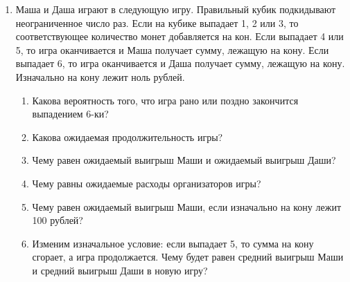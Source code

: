 \documentclass[12pt]{article}
\newcommand{\addtag}[1]{}
\begin{document}
\begin{enumerate}[resume]
   \item  Маша и Даша играют в следующую игру. 
 Правильный кубик подкидывают неограниченное число раз.
 Если на кубике\addtag{кубик} выпадает 1, 2 или 3, то соответствующее количество монет добавляется на кон.
 Если выпадает 4 или 5, то игра оканчивается и Маша получает сумму, лежащую на кону.
 Если выпадает 6, то игра оканчивается и Даша получает сумму, лежащую на кону. 
 Изначально на кону лежит ноль рублей.
\begin{enumerate}
\item Какова вероятность того, что игра рано или поздно закончится выпадением 6-ки?
\item Какова ожидаемая продолжительность игры?
\item Чему равен ожидаемый выигрыш Маши и ожидаемый выигрыш Даши?
\item Чему равны ожидаемые расходы организаторов игры?
\item Чему равен ожидаемый выигрыш Маши, если изначально на кону лежит 100 рублей?
\item Изменим изначальное условие: если выпадает 5, то сумма на кону сгорает, а игра продолжается.
Чему будет равен средний выигрыш Маши и средний выигрыш Даши в новую игру?
\end{enumerate}

   
\end{enumerate}
\end{document}
